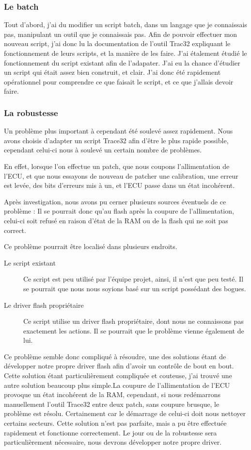 	\subsubsection{Le batch}
	Tout d'abord, j'ai du modifier un script batch, dans un langage que je connaissais pas, manipulant un outil que je connaissais pas. Afin de pouvoir effectuer mon nouveau script, j'ai donc lu la documentation de l'outil Trac32 expliquant le fonctionnement de leurs scripts, et la manière de les faire. J'ai étalement étudié le fonctionnement du script existant afin de l'adapater. J'ai eu la chance d'étudier un script qui était assez bien construit, et clair. J'ai donc été rapidement opérationnel pour comprendre ce que faisait le script, et ce que j'allais devoir faire.
	
	\subsubsection{La robustesse}
Un problème plus important à cependant été soulevé assez rapidement. Nous avons choisis d'adapter un script Trace32 afin d'être le plus rapide possible, cependant celui-ci nous à soulevé un certain nombre de problèmes.

En effet, lorsque l'on effectue un patch, que nous coupons l'allimentation de l'ECU, et que nous essayons de nouveau de patcher une calibration, une erreur est levée, des bits d'erreurs mis à un, et l'ECU passe dans un état incohérent. 

Après investigation, nous avons pu cerner plusieurs sources éventuels de ce problème : 
Il se pourrait donc qu'au flash après la coupure de l'allimentation, celui-ci soit refusé en raison d'état de la RAM ou de la flash qui ne soit pas correct. 

Ce problème pourrait être localisé dans plusieurs endroits.
\begin{description}
\item[Le script existant] Ce script est peu utilisé par l'équipe projet, ainsi, il n'est que peu testé. Il se pourrait que nous nous soyions basé sur un script possédant des bogues.
\item[Le driver flash propriétaire] Ce script utilise un driver flash propriétaire, dont nous ne connaissons pas exactement les actions. Il se pourrait que le problème vienne également de lui.
\end{description}

Ce problème semble donc compliqué à résoudre, une des solutions étant de développer notre propre driver flash afin d'avoir un contrôle de bout en bout. Cette solution étant particulièrement compliquée et couteuse, j'ai trouvé une autre solution beaucoup plus simple.\newline La coupure de l'allimentation de l'ECU provoque un état incohérent de la RAM, cependant, si nous redémarrons manuellement l'outil Trace32 entre deux patch, sans coupure brusque, le problème est résolu. Certainement car le démarrage de celui-ci doit nous nettoyer certains secteurs. Cette solution n'est pas parfaite, mais a pu être effectuée rapidement et fonctionne correctement. Le jour ou de la robustesse sera particulièrement nécessaire, nous devrons développer notre propre driver.

